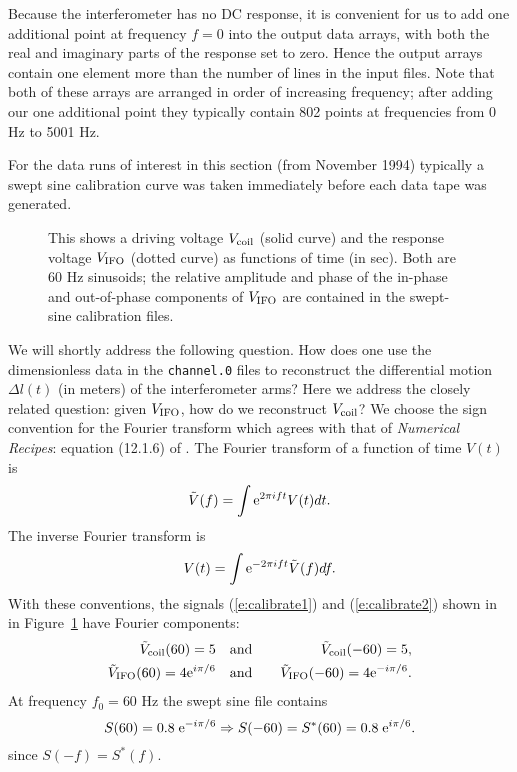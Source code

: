Because the interferometer has no DC response, it is convenient for us
to add one additional point at frequency $f=0$ into the output data
arrays, with both the real and imaginary parts of the response set to
zero.  Hence the output arrays contain one element more than the number
of lines in the input files.  Note that both of these arrays are
arranged in order of increasing frequency; after adding our one
additional point they typically contain 802 points at frequencies from
0 Hz to 5001 Hz.

For the data runs of interest in this section (from
November 1994) typically a swept sine calibration curve was taken
immediately before each data tape was generated.

\begin{figure}[t]
\begin{center}
\caption{ \label{f:phase} This shows a driving voltage $V_{\rm coil}$
(solid curve) and the response voltage $V_{\rm IFO}$ (dotted curve) as
functions of time (in sec).  Both are 60 Hz sinusoids; the relative
amplitude and phase of the in-phase and out-of-phase components of
$V_{\rm IFO}$ are contained in the swept-sine calibration files.}
\end{center}
\end{figure}

We will shortly address the following question.  How does one use the
dimensionless data in the {\tt channel.0} files to reconstruct the
differential motion $\Delta l(t)$ (in meters) of the interferometer
arms?  Here we address the closely related question:  given $V_{\rm
IFO}$, how do we reconstruct $V_{\rm coil}$?  We choose the sign
convention for the Fourier transform which agrees with that of {\it
Numerical Recipes}:  equation (12.1.6) of \cite{NumRec}.  The Fourier
transform of a function of time $V(t)$ is
\begin{equation}
\label{e:fft1}
{\tilde V}(f) = \int {\rm e}^{2 \pi i f t} V(t) dt.
\end{equation}
The inverse Fourier transform is
\begin{equation}
\label{e:fft2}
V(t)= \int {\rm e}^{-2 \pi i f t} {\tilde V}(f) df.
\end{equation}
With these conventions, the signals (\ref{e:calibrate1}) and
(\ref{e:calibrate2}) shown in in Figure~\ref{f:phase} have Fourier
components:
\begin{eqnarray}
{\tilde V}_{\rm coil}(60) = 5                  \quad &{\rm and}& \quad {\tilde V}_{\rm coil}(-60) = 5,\\
{\tilde V}_{\rm IFO}(60)  = 4{\rm e}^{i \pi/6} \quad &{\rm and}& \quad {\tilde V}_{\rm IFO}(-60)  = 4 {\rm e}^{-i \pi/6}.
\end{eqnarray}
At frequency $f_0=60$ Hz the swept sine file
contains
\begin{equation}
S(60) = 0.8 \; {\rm e}^{-i \pi/6} \Rightarrow S(-60) = S^*(60) =
0.8 \; {\rm e}^{i \pi/6}.
\end{equation}
since $S(-f) = S^*(f)$.

